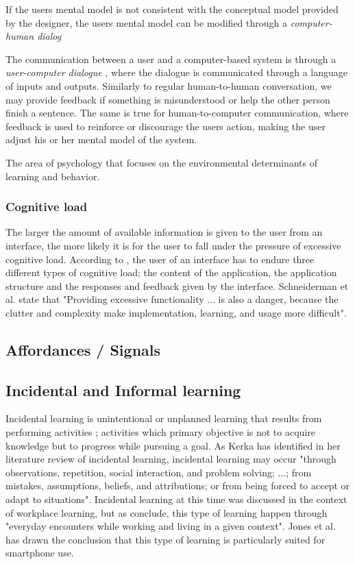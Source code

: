 If the users mental model is not consistent with the conceptual model provided by the designer, the users mental model can be modified through a \textit{computer-human dialog}

The communication between a user and a computer-based system is through a \textit{user-computer dialogue} \cite{Foley1996}, where the dialogue is communicated through a language of inputs and outputs. Similarly to regular human-to-human conversation, we may provide feedback if something is misunderstood or help the other person finish a sentence. The same is true for human-to-computer communication, where feedback is used to reinforce or discourage the users action, making the user adjust his or her mental model of the system.

The area of psychology that focuses on the environmental determinants of learning and behavior.

\subsubsection{Cognitive load}
The larger the amount of available information is given to the user from an interface, the more likely it is for the user to fall under the pressure of excessive cognitive load. According to \cite{Jih1992}, the user of an interface has to endure three different types of cognitive load; the content of the application, the application structure and the responses and feedback given by the interface. Schneiderman et al. state that "Providing excessive functionality ... is also a danger, because the clutter and complexity make implementation, learning, and usage more difficult".

\subsection{Affordances / Signals}

\subsection{Incidental and Informal learning}
Incidental learning is unintentional or unplanned learning that results from performing activities \cite{Kerka2000}; activities which primary objective is not to acquire knowledge but to progress while pursuing a goal. As Kerka \cite{Kerka2000} has identified in her literature review of incidental learning, incidental learning may occur "through observations, repetition, social interaction, and problem solving; ...; from mistakes, assumptions, beliefs, and attributions; or from being forced to accept or adapt to situations". Incidental learning at this time was discussed in the context of workplace learning, but as \cite{Marsick2001} conclude, this type of learning happen through "everyday encounters while working and living in a given context". Jones et al. \cite{Jones2014} has drawn the conclusion that this type of learning is particularly suited for smartphone use.

